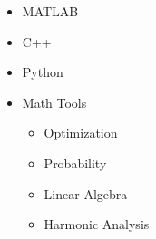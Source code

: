 \begin{itemize}
    \item MATLAB
    \item C++
    \item Python
    \item Math Tools
         \begin{itemize}
             \item Optimization
             \item Probability
             \item Linear Algebra
             \item Harmonic Analysis
         \end{itemize}
\end{itemize}
